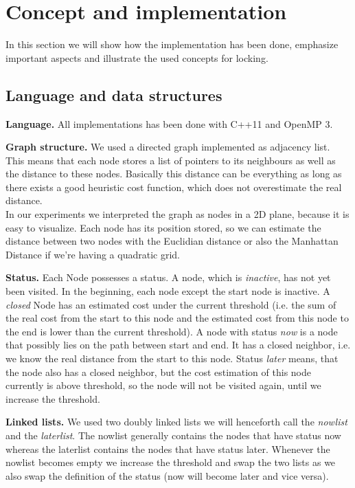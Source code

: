 \documentclass[letterpaper]{article}
\newcommand{\mypar}[1]{{\bf #1.}}
\begin{document}
\section{Concept and implementation}\label{sec:impl}

In this section we will show how the implementation has been done, emphasize important aspects and illustrate the used concepts for locking. 

\subsection{Language and data structures}\label{ssec:lang}

\mypar{Language} All implementations has been done with C++11 and OpenMP 3.

\mypar{Graph structure}
We used a directed graph implemented as adjacency list. This means that each node stores a list of pointers to its neighbours as well as the distance to these nodes. Basically this distance can be everything as long as there exists a good heuristic cost function, which does not overestimate the real distance. \\
In our experiments we interpreted the graph as nodes in a 2D plane, because it is easy to visualize. Each node has its position stored, so we can estimate the distance between two nodes with the Euclidian distance or also the Manhattan Distance if we're having a quadratic grid.

\mypar{Status}
Each Node possesses a status. A node, which is \textit{inactive}, has not yet been visited. In the beginning, each node except the start node is inactive. A \textit{closed} Node has an estimated cost under the current threshold (i.e. the sum of the real cost from the start to this node and the estimated cost from this node to the end is lower than the current threshold). A node with status \textit{now} is a node that possibly lies on the path between start and end. It has a closed neighbor, i.e. we know the real distance from the start to this node. Status \textit{later} means, that the node also has a closed neighbor, but the cost estimation of this node currently is above threshold, so the node will not be visited again, until we increase the threshold.

\mypar{Linked lists}
We used two doubly linked lists we will henceforth call the \textit{nowlist} and the \textit{laterlist}. The nowlist generally contains the nodes that have status now whereas the laterlist contains the nodes that have status later. Whenever the nowlist becomes empty we increase the threshold and swap the two lists as we also swap the definition of the status (now will become later and vice versa). 
\end{document}
